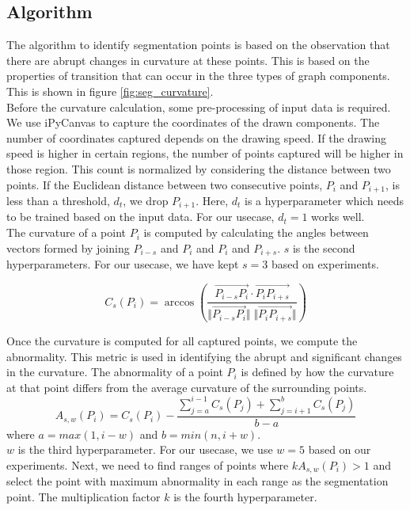 \subsection{Algorithm}
The algorithm to identify segmentation points is based on the observation that there are abrupt changes in curvature at these points. This is based on the properties of transition that can occur in the three types of graph components. This is shown in figure \ref{fig:seg_curvature}.\\

Before the curvature calculation, some pre-processing of input data is required. We use iPyCanvas \cite{ipycanvas} to capture the coordinates of the drawn components. The number of coordinates captured depends on the drawing speed. If the drawing speed is higher in certain regions, the number of points captured will be higher in those region. This count is normalized by considering the distance between two points. If the Euclidean distance between two consecutive points, $P_i$ and $P_{i+1}$, is less than a threshold, $d_t$, we drop $P_{i+1}$. Here, $d_t$ is a hyperparameter which needs to be trained based on the input data. For our usecase, $d_t = 1$ works well.\\

The curvature of a point $P_i$ is computed by calculating the angles between vectors formed by joining $P_{i-s}$ and $P_i$ and $P_i$ and $P_{i+s}$. $s$ is the second hyperparameters. For our usecase, we have kept $s=3$ based on experiments.

\begin{equation}
	C_s(P_i) = \arccos \left(  \frac{\overrightarrow{P_{i-s} P_i} \cdot \overrightarrow{P_i P_{i+s}}}{ \Vert \overrightarrow{P_{i-s} P_i}  \Vert \; \Vert \overrightarrow{P_i P_{i+s}} \Vert  } \right) 
\end{equation} 

Once the curvature is computed for all captured points, we compute the abnormality. This metric is used in identifying the abrupt and significant changes in the curvature. The abnormality of a point $P_i$ is defined by how the curvature at that point differs from the average curvature of the surrounding points.
\begin{equation}
	A_{s,w}(P_i) = C_s(P_i) - \frac{\sum_{j=a}^{i-1} C_s(P_j) + \sum_{j=i+1}^{b} C_s(P_j)}{b - a}
\end{equation}
where $a = max(1, i-w)$ and $b = min(n, i+w)$.\\

$w$ is the third hyperparameter. For our usecase, we use $w=5$ based on our experiments. Next, we need to find ranges of points where $k A_{s, w}(P_i) > 1$ and select the point with maximum abnormality in each range as the segmentation point. The multiplication factor $k$ is the fourth hyperparameter.\\

